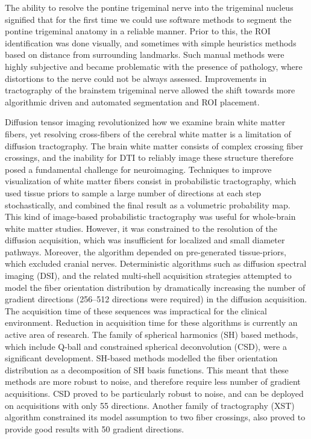 The ability to resolve the pontine trigeminal nerve into the trigeminal nucleus signified that for the first time we could use software methods to segment the pontine trigeminal anatomy in a reliable manner. Prior to this, the ROI identification was done visually, and sometimes with simple heuristics methods based on distance from surrounding landmarks. Such manual methods were highly subjective and became problematic with the presence of pathology, where distortions to the nerve could not be always assessed. Improvements in tractography of the brainstem trigeminal nerve allowed the shift towards more algorithmic driven and automated segmentation and ROI placement.

Diffusion tensor imaging revolutionized how we examine brain white matter fibers, yet resolving cross-fibers of the cerebral white matter is a limitation of diffusion tractography. The brain white matter consists of complex crossing fiber crossings, and the inability for DTI to reliably image these structure therefore posed a fundamental challenge for neuroimaging.
Techniques to improve visualization of white matter fibers consist in probabilistic tractography, which used tissue priors to sample a large number of directions at each step stochastically, and combined the final result as a volumetric probability map. This kind of image-based probabilistic tractography was useful for whole-brain white matter studies. However, it was constrained to the resolution of the diffusion acquisition, which was insufficient for localized and small diameter pathways. Moreover, the algorithm depended on pre-generated tissue-priors, which excluded cranial nerves. 
Deterministic algorithms such as diffusion spectral imaging (DSI), and the related multi-shell acquisition strategies attempted to model the fiber orientation distribution by dramatically increasing the number of gradient directions (256--512 directions were required) in the diffusion acquisition. The acquisition time of these sequences was impractical for the clinical environment. Reduction in acquisition time for these algorithms is currently an active area of research.
The family of spherical harmonics (SH) based methods, which include Q-ball and constrained spherical deconvolution (CSD), were a significant development. SH-based methods modelled the fiber orientation distribution as a decomposition of SH basis functions. This meant that these methods are more robust to noise, and therefore require less number of gradient acquisitions. CSD proved to be particularly robust to noise, and can be deployed on acquisitions with only 55 directions. Another family of tractography (XST) algorithm constrained its model assumption to two fiber crossings, also proved to provide good results with 50 gradient directions.

